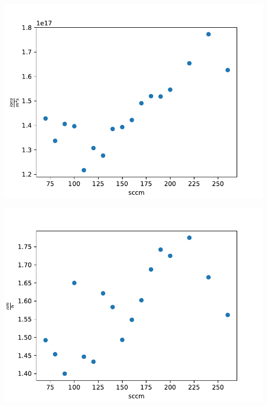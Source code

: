 \documentclass{beamer} %
\begin{document}
\begin{frame}
\begin{minipage}{0.49\textwidth}
        \includegraphics[width=1.1\textwidth]{figures/Gasvary_H2_2A_flux.pdf}
    \end{minipage}
    \begin{minipage}{0.49\textwidth}
        \includegraphics[width=1.1\textwidth]{figures/Gasvary_H2_2A_worstcasesput.pdf}
    \end{minipage}
\end{frame}
\end{document}
